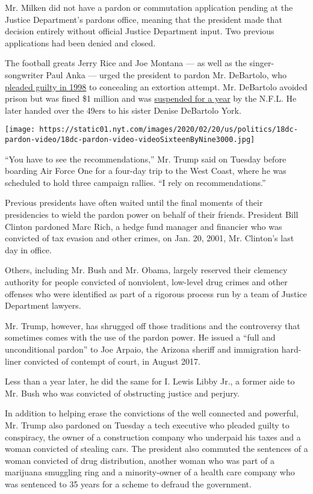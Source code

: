 Mr. Milken did not have a pardon or commutation application pending at
the Justice Department's pardons office, meaning that the president made
that decision entirely without official Justice Department input. Two
previous applications had been denied and closed.

The football greats Jerry Rice and Joe Montana --- as well as the
singer-songwriter Paul Anka --- urged the president to pardon Mr.
DeBartolo, who
\href{https://www.nytimes.com/1998/10/07/us/owner-of-nfl-team-ties-ex-governor-to-extortion.html}{pleaded
guilty in 1998} to concealing an extortion attempt. Mr. DeBartolo
avoided prison but was fined \$1 million and was
\href{http://www.nytimes.com/1999/03/17/sports/pro-football-nfl-picks-los-angeles-with-conditions.html}{suspended
for a year} by the N.F.L. He later handed over the 49ers to his sister
Denise DeBartolo York.

\texttt{[image: https://static01.nyt.com/images/2020/02/20/us/politics/18dc-pardon-video/18dc-pardon-video-videoSixteenByNine3000.jpg]}

``You have to see the recommendations,'' Mr. Trump said on Tuesday
before boarding Air Force One for a four-day trip to the West Coast,
where he was scheduled to hold three campaign rallies. ``I rely on
recommendations.''

Previous presidents have often waited until the final moments of their
presidencies to wield the pardon power on behalf of their friends.
President Bill Clinton pardoned Marc Rich, a hedge fund manager and
financier who was convicted of tax evasion and other crimes, on Jan. 20,
2001, Mr. Clinton's last day in office.

Others, including Mr. Bush and Mr. Obama, largely reserved their
clemency authority for people convicted of nonviolent, low-level drug
crimes and other offenses who were identified as part of a rigorous
process run by a team of Justice Department lawyers.

Mr. Trump, however, has shrugged off those traditions and the
controversy that sometimes comes with the use of the pardon power. He
issued a ``full and unconditional pardon'' to Joe Arpaio, the Arizona
sheriff and immigration hard-liner convicted of contempt of court, in
August 2017.

Less than a year later, he did the same for I. Lewis Libby Jr., a former
aide to Mr. Bush who was convicted of obstructing justice and perjury.

In addition to helping erase the convictions of the well connected and
powerful, Mr. Trump also pardoned on Tuesday a tech executive who
pleaded guilty to conspiracy, the owner of a construction company who
underpaid his taxes and a woman convicted of stealing cars. The
president also commuted the sentences of a woman convicted of drug
distribution, another woman who was part of a marijuana smuggling ring
and a minority-owner of a health care company who was sentenced to 35
years for a scheme to defraud the government.

